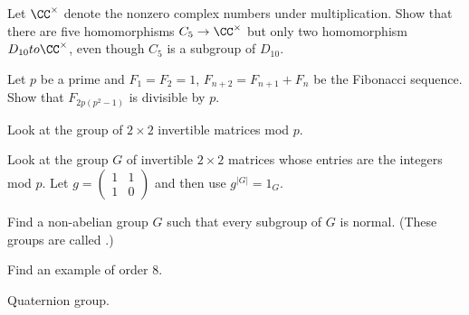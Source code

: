 \begin{problem}
	Let $\CC^\times$ denote the nonzero complex numbers under multiplication.
	Show that there are five homomorphisms $C_5 \to \CC^\times$
	but only two homomorphism $D_{10} to \CC^\times$,
	even though $C_5$ is a subgroup of $D_{10}$.
\end{problem}

\begin{problem}
	Let $p$ be a prime and $F_1 = F_2 = 1$, $F_{n+2} = F_{n+1} + F_n$
	be the Fibonacci sequence.
	Show that $F_{2p(p^2-1)}$ is divisible by $p$.
	\begin{hint}
		Look at the group of $2 \times 2$ invertible matrices mod $p$.
	\end{hint}
	\begin{sol}
		Look at the group $G$ of invertible $2 \times 2$ matrices whose entries
		are the integers mod $p$.
		Let $g = \begin{pmatrix} 1 & 1 \\ 1 & 0 \end{pmatrix}$
		and then use $g^{\left\lvert G \right\rvert} = 1_G$.
	\end{sol}
\end{problem}

\begin{problem}
	\gim
	Find a non-abelian group $G$
	such that every subgroup of $G$ is normal.
	(These groups are called .)
	\begin{hint}
		Find an example of order $8$.
	\end{hint}
	\begin{sol}
		Quaternion group.
	\end{sol}
\end{problem}


